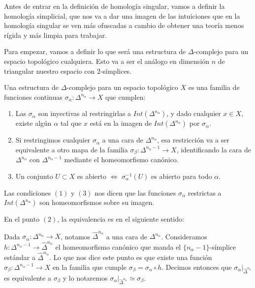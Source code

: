 Antes de entrar en la definición de homología singular, vamos a definir la homología simplicial, que nos va a dar una imagen de las intuiciones que en la homología singular se ven más ofuscadas a cambio de obtener una teoría menos rígida y más limpia para trabajar.  \br

Para empezar, vamos a definir lo que será una estructura de $\Delta$-complejo para un espacio topológico cualquiera. Esto va a ser el análogo en dimensión $n$ de triangular nuestro espacio con $2$-símplices.\br


\begin{df}
    Una estructura de $\Delta$-complejo para un espacio topológico $X$ es una familia de funciones continuas $\sigma_\alpha:\Delta^{n_\alpha}\to X$ que cumplen:\br

    \begin{enumerate}
        \item Las $\sigma_\alpha$ son inyectivas al restringirlas a $Int(\Delta^{n_\alpha})$, y dado cualquier $x\in X$, existe algún $\alpha$ tal que $x$ está en la imagen de $Int(\Delta^{n_\alpha})$ por $\sigma_\alpha$.
        
        \item Si restringimos cualquier $\sigma_\alpha$ a una cara de $\Delta^{n_\alpha}$, esa restricción va a ser equivalente a otro mapa de la familia $\sigma_\beta:\Delta^{n_\alpha-1}\to X$, identificando la cara de $\Delta^{n_\alpha}$ con $\Delta^{n_\alpha-1}$ mediante el homeomorfismo canónico.

        \item Un conjunto $U\subset X$ es abierto $\iff$ $\sigma_\alpha^{-1}(U)$ es abierto para todo $\alpha$.
    \end{enumerate}
\end{df}\br

Las condiciones $(1)$ y $(3)$ nos dicen que las funciones $\sigma_\alpha$ restrictas a $Int(\Delta^{n_\alpha})$ son homeomorfismos sobre su imagen.\br

En el punto $(2)$, la equivalencia es en el siguiente sentido: \br

Dada $\sigma_\alpha:\Delta^{n_\alpha}\to X$, notamos $\hat{\Delta}^{n_\alpha}$ a una cara de $\Delta^{n_\alpha}$. Consideramos $h:\Delta^{n_\alpha -1}\to\hat{\Delta}^{n_\alpha}$ el homeomorfismo canónico que manda el $\{n_\alpha -1\}$-símplice estándar a $\hat{\Delta}^{n_\alpha}$. Lo que nos dice este punto es que existe una función $\sigma_\beta:\Delta^{n_\alpha -1}\to X$ en la familia que cumple $\sigma_\beta=\sigma_\alpha\circ h$. Decimos entonces que $\sigma_\alpha |_{\hat{\Delta}^{n_\alpha}}$ es equivalente a $\sigma_\beta$ y lo notaremos $\sigma_\alpha |_{\hat{\Delta}^{n_\alpha}}\simeq\sigma_\beta$.\br

